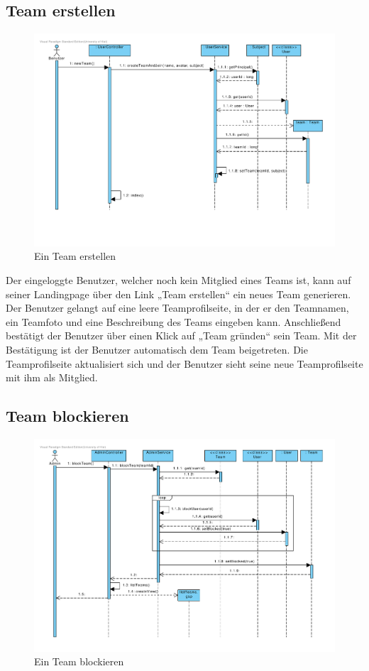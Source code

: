 \subsection{Team erstellen}
\begin{figure}[H]
  \centering
  \includegraphics[width=\textwidth, clip]{gfx/team_erstellen}
  \caption{Ein Team erstellen}
\end{figure}

Der eingeloggte Benutzer, welcher noch kein Mitglied eines Teams ist,
kann auf seiner Landingpage über den Link „Team erstellen“ ein neues
Team generieren. Der Benutzer gelangt auf eine leere Teamprofilseite,
in der er den Teamnamen, ein Teamfoto und eine Beschreibung des Teams
eingeben kann. Anschließend bestätigt der Benutzer über einen Klick
auf „Team gründen“ sein Team. Mit der Bestätigung ist der Benutzer
automatisch dem Team beigetreten. Die Teamprofilseite aktualisiert
sich und der Benutzer sieht seine neue Teamprofilseite mit ihm als
Mitglied.\\

\subsection{Team blockieren}

\begin{figure}[H]
  \centering
  \includegraphics[width=\textwidth, clip]{gfx/team_blockieren}
  \caption{Ein Team blockieren}
\end{figure}

